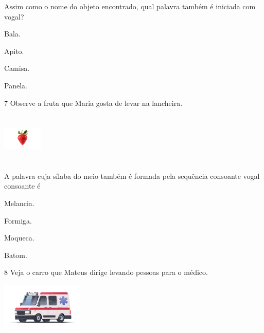 
Assim como o nome do objeto encontrado, qual palavra também é iniciada com vogal?

\begin{escolha}
\item Bala.

\item Apito.

\item Camisa.

\item Panela.
\end{escolha}

\num{7} Observe a fruta que Maria gosta de levar na lancheira.

\includegraphics[width=0.73819in,height=0.93750in]{media/image152.jpeg}


A palavra cuja sílaba do meio também é formada pela sequência consoante vogal consoante é

\begin{escolha}
\item Melancia.

\item Formiga.

\item Moqueca.

\item Batom.
\end{escolha}

\num{8} Veja o carro que Mateus dirige levando pessoas para o médico.

\includegraphics[width=1.54514in,height=0.89444in]{media/image153.jpeg}


